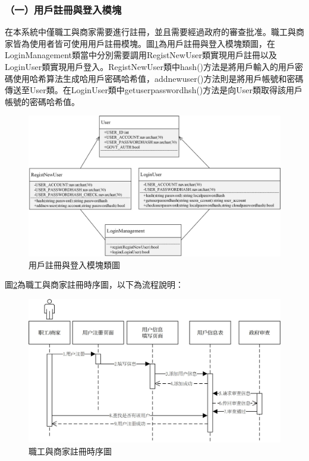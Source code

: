 \subsubsection{（一）用戶註冊與登入模塊}
在本系統中僅職工與商家需要進行註冊，並且需要經過政府的審查批准。職工與商家皆為使用者皆可使用用戶註冊模塊。圖\ref{c3}為用戶註冊與登入模塊類圖，在LoginManagement類當中分別需要調用RegistNewUser類實現用戶註冊以及LoginUser類實現用戶登入。RegistNewUser類中hash()方法是將用戶輸入的用戶密碼使用哈希算法生成哈用戶密碼哈希值，addnewuser()方法則是將用戶帳號和密碼傳送至User類。在LoginUser類中getuserpasswordhsh()方法是向User類取得該用戶帳號的密碼哈希值。

	\begin{figure}[!htbp]
		\centering
		\includegraphics[width = 1\textwidth]{c3.jpg}
		\caption{用戶註冊與登入模塊類圖}\label{c3}
	\end{figure}

	圖\ref{time1}為職工與商家註冊時序圖，以下為流程說明：

	\begin{figure}[!htbp]
		\centering
		\includegraphics[width = 1\textwidth]{time1.jpg}
		\caption{職工與商家註冊時序圖}\label{time1}
	\end{figure}

